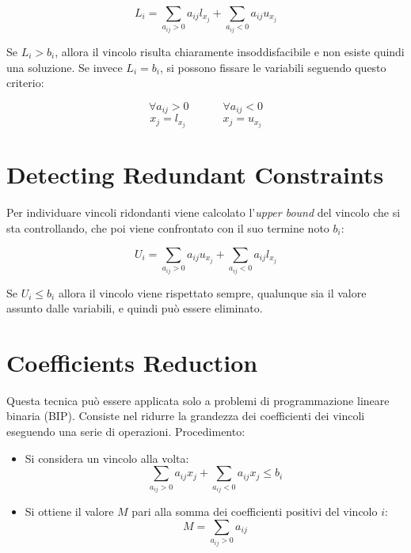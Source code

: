 \documentclass{article}
\begin{document}
\[
L_i = \sum_{a_{ij}>0}a_{ij} l_{x_{j}} + \sum_{a_{ij}<0}a_{ij} u_{x_{j}}
\]

Se $L_i>b_i$, allora il vincolo risulta chiaramente insoddisfacibile e non esiste quindi una soluzione.
\newline
Se invece $L_i=b_i$, si possono fissare le variabili seguendo questo criterio:

\[\forall a_{ij}>0 \;\;\;\;\;\;\;\;\;\;\;\forall a_{ij}<0 \]
\[x_j = l_{x_{j}} \;\;\;\;\;\;\;\;\;\;\;\; x_j = u_{x_{j}}\]

\section{Detecting Redundant Constraints}
Per individuare vincoli ridondanti viene calcolato l'\textit{upper bound} del vincolo che si sta controllando, che poi viene confrontato con il suo termine noto $b_i$:

\[
U_i = \sum_{a_{ij}>0}a_{ij} u_{x_{j}} + \sum_{a_{ij}<0}a_{ij} l_{x_{j}}
\]

Se $U_i \le b_i $ allora il vincolo viene rispettato sempre, qualunque sia il valore assunto dalle variabili, e quindi può essere eliminato. 

\section{Coefficients Reduction}

Questa tecnica può essere applicata solo a problemi di programmazione lineare binaria (BIP). Consiste nel ridurre la grandezza dei coefficienti dei vincoli eseguendo una serie di operazioni.
\newline
\newline
Procedimento:

\begin{itemize}
\item Si considera un vincolo alla volta:
\[\sum_{a_{ij}>0}a_{ij}x_{j} + \sum_{a_{ij}<0}a_{ij}x_{j} \le b_i \]
\item Si ottiene il valore $M$ pari alla somma dei coefficienti positivi del vincolo $i$:
\[M = \sum_{a_{ij}>0}a_{ij} \]
\end{itemize}
\end{document}
